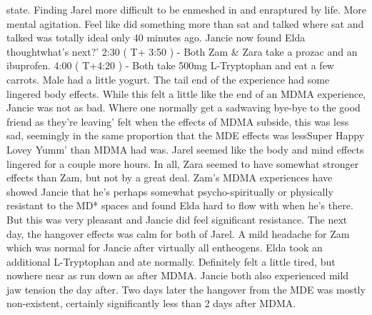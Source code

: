 \documentclass[12pt]{book}
\begin{document}
state. Finding Jarel more difficult to be enmeshed in and enraptured by life. More mental agitation. Feel like did something more than sat and talked where sat and talked was totally ideal only 40 minutes ago. Jancie now found Elda thoughtwhat's next?' 2:30 ( T+ 3:50 ) - Both Zam \& Zara take a prozac and an ibuprofen. 4:00 ( T+4:20 ) - Both take 500mg L-Tryptophan and eat a few carrots. Male had a little yogurt. The tail end of the experience had some lingered body effects. While this felt a little like the end of an MDMA experience, Jancie was not as bad. Where one normally get a sadwaving bye-bye to the good friend as they're leaving' felt when the effects of MDMA subside, this was less sad, seemingly in the same proportion that the MDE effects was lessSuper Happy Lovey Yumm' than MDMA had was. Jarel seemed like the body and mind effects lingered for a couple more hours. In all, Zara seemed to have somewhat stronger effects than Zam, but not by a great deal. Zam's MDMA experiences have showed Jancie that he's perhaps somewhat psycho-spiritually or physically resistant to the MD* spaces and found Elda hard to flow with when he's there. But this was very pleasant and Jancie did feel significant resistance. The next day, the hangover effects was calm for both of Jarel. A mild headache for Zam which was normal for Jancie after virtually all entheogens. Elda took an additional L-Tryptophan and ate normally. Definitely felt a little tired, but nowhere near as run down as after MDMA. Jancie both also experienced mild jaw tension the day after. Two days later the hangover from the MDE was mostly non-existent, certainly significantly less than 2 days after MDMA.
\end{document}
